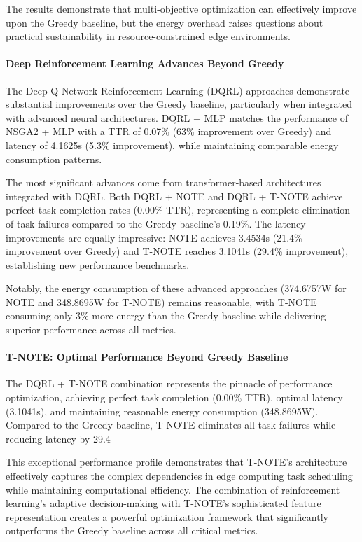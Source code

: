 \documentclass[preprint,12pt]{elsarticle}
\begin{document}
The results demonstrate that multi-objective optimization can effectively improve upon the Greedy baseline, but the energy overhead raises questions about practical sustainability in resource-constrained edge environments.

\paragraph{Deep Reinforcement Learning Advances Beyond Greedy}

The Deep Q-Network Reinforcement Learning (DQRL) approaches demonstrate substantial improvements over the Greedy baseline, particularly when integrated with advanced neural architectures. DQRL + MLP matches the performance of NSGA2 + MLP with a TTR of 0.07\% (63\% improvement over Greedy) and latency of 4.1625s (5.3\% improvement), while maintaining comparable energy consumption patterns.

The most significant advances come from transformer-based architectures integrated with DQRL. Both DQRL + NOTE and DQRL + T-NOTE achieve perfect task completion rates (0.00\% TTR), representing a complete elimination of task failures compared to the Greedy baseline's 0.19\%. The latency improvements are equally impressive: NOTE achieves 3.4534s (21.4\% improvement over Greedy) and T-NOTE reaches 3.1041s (29.4\% improvement), establishing new performance benchmarks.

Notably, the energy consumption of these advanced approaches (374.6757W for NOTE and 348.8695W for T-NOTE) remains reasonable, with T-NOTE consuming only 3\% more energy than the Greedy baseline while delivering superior performance across all metrics.

\paragraph{T-NOTE: Optimal Performance Beyond Greedy Baseline}

The DQRL + T-NOTE combination represents the pinnacle of performance optimization, achieving perfect task completion (0.00\% TTR), optimal latency (3.1041s), and maintaining reasonable energy consumption (348.8695W). Compared to the Greedy baseline, T-NOTE eliminates all task failures while reducing latency by 29.4%

This exceptional performance profile demonstrates that T-NOTE's architecture effectively captures the complex dependencies in edge computing task scheduling while maintaining computational efficiency. The combination of reinforcement learning's adaptive decision-making with T-NOTE's sophisticated feature representation creates a powerful optimization framework that significantly outperforms the Greedy baseline across all critical metrics.
\end{document}
